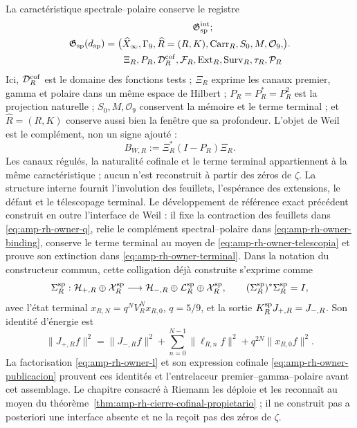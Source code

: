 La caractéristique spectrale--polaire conserve le registre
\begin{equation}\label{eq:pdf2-g-sp-explicito}
 \mathfrak G_{\rm sp}(d_{\rm sp})=
 \bigl(
 \begin{gathered}
  \mathfrak G_{\rm sp}^{\rm int};\\
  \widehat X_\infty,\Gamma_9,\widehat R=(R,K),
  \operatorname{Carr}_R,S_0,M,\mathcal O_9,\\
  \Xi_R,P_R,\mathcal D_R^{\rm cof},
  \mathcal F_R,\operatorname{Ext}_R,\operatorname{Surv}_R,
  \tau_R,\mathcal P_R
 \end{gathered}
 \bigr).
\end{equation}
Ici, $\mathcal D_R^{\rm cof}$ est le domaine des fonctions tests ; $\Xi_R$ exprime les canaux premier, gamma et polaire dans un même espace de Hilbert ; $P_R=P_R^*=P_R^2$ est la projection naturelle ; $S_0,M,\mathcal O_9$ conservent la mémoire et le terme terminal ; et $\widehat R=(R,K)$ conserve aussi bien la fenêtre que sa profondeur. L’objet de Weil est le complément, non un signe ajouté :
\begin{equation}\label{eq:pdf2-g-sp-complemento}
 B_{W,R}:=\Xi_R^*(I-P_R)\Xi_R.
\end{equation}
Les canaux régulés, la naturalité cofinale et le terme terminal appartiennent à la même caractéristique ; aucun n’est reconstruit à partir des zéros de $\zeta$. La structure interne fournit l’involution des feuillets, l’espérance des extensions, le défaut et le télescopage terminal. Le développement de référence exact précédent construit en outre l’interface de Weil : il fixe la contraction des feuillets dans \eqref{eq:amp-rh-owner-q}, relie le complément spectral--polaire dans \eqref{eq:amp-rh-owner-binding}, conserve le terme terminal au moyen de \eqref{eq:amp-rh-owner-telescopia} et prouve son extinction dans \eqref{eq:amp-rh-owner-terminal}. Dans la notation du constructeur commun, cette colligation déjà construite s’exprime comme
\begin{equation}\label{eq:pdf2-g-sp-coligacion-dato}
 \Sigma_R^{\rm sp}:
 \mathcal H_{+,R}\oplus\mathcal X_R^{\rm sp}
 \longrightarrow
 \mathcal H_{-,R}\oplus\mathcal L_R^{\rm sp}
 \oplus\mathcal X_R^{\rm sp},
 \qquad
 (\Sigma_R^{\rm sp})^*\Sigma_R^{\rm sp}=I,
\end{equation}
avec l’état terminal $x_{R,N}=q^NV_R^Nx_{R,0}$, $q=5/9$, et la sortie $K_R^{\rm sp}J_{+,R}=J_{-,R}$. Son identité d’énergie est
\begin{equation}\label{eq:pdf2-g-sp-identidad-finita-dato}
 \|J_{+,R}f\|^2
 =\|J_{-,R}f\|^2+
   \sum_{n=0}^{N-1}\|\ell_{R,n}f\|^2+
   q^{2N}\|x_{R,0}f\|^2.
\end{equation}
La factorisation \eqref{eq:amp-rh-owner-l} et son expression cofinale \eqref{eq:amp-rh-owner-publicacion} prouvent ces identités et l’entrelaceur premier--gamma--polaire avant cet assemblage. Le chapitre consacré à Riemann les déploie et les reconnaît au moyen du théorème~\ref{thm:amp-rh-cierre-cofinal-propietario} ; il ne construit pas a posteriori une interface absente et ne la reçoit pas des zéros de $\zeta$.

